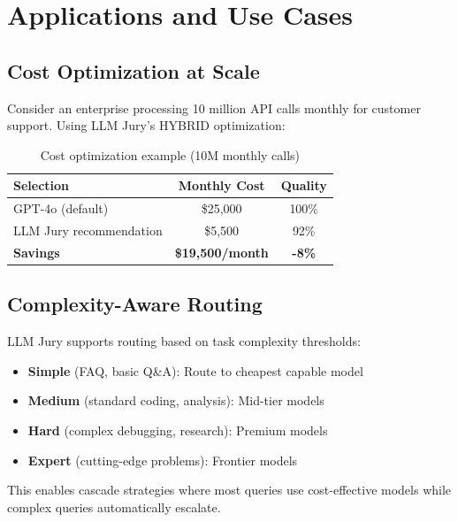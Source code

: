 \documentclass[11pt,a4paper]{article}
\begin{document}

\section{Applications and Use Cases}

\subsection{Cost Optimization at Scale}

Consider an enterprise processing 10 million API calls monthly for customer support. Using LLM Jury's HYBRID optimization:

\begin{table}[h]
\centering
\caption{Cost optimization example (10M monthly calls)}
\label{tab:cost_example}
\begin{tabular}{@{}lcc@{}}
\toprule
\textbf{Selection} & \textbf{Monthly Cost} & \textbf{Quality} \\
\midrule
GPT-4o (default) & \$25,000 & 100\% \\
LLM Jury recommendation & \$5,500 & 92\% \\
\textbf{Savings} & \textbf{\$19,500/month} & \textbf{-8\%} \\
\bottomrule
\end{tabular}
\end{table}

\subsection{Complexity-Aware Routing}

LLM Jury supports routing based on task complexity thresholds:

\begin{itemize}
    \item \textbf{Simple} (FAQ, basic Q\&A): Route to cheapest capable model
    \item \textbf{Medium} (standard coding, analysis): Mid-tier models
    \item \textbf{Hard} (complex debugging, research): Premium models
    \item \textbf{Expert} (cutting-edge problems): Frontier models
\end{itemize}

This enables cascade strategies where most queries use cost-effective models while complex queries automatically escalate.
\end{document}
